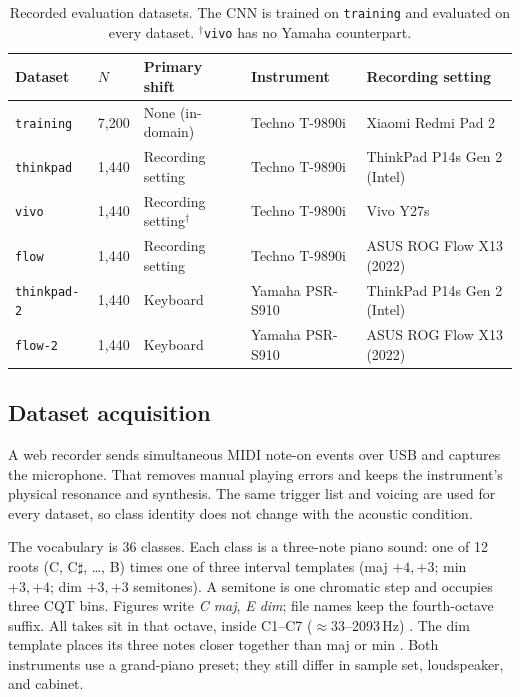 \documentclass[pdflatex,sn-mathphys-num,iicol]{sn-jnl}
\theoremstyle{thmstyleone}
\theoremstyle{thmstyletwo}
\theoremstyle{thmstylethree}
\begin{document}
\begin{table}[t]
\caption{Recorded evaluation datasets. The CNN is trained on \texttt{training} and evaluated on every dataset. $^\dagger$\texttt{vivo} has no Yamaha counterpart.}\label{tab:scenarios}
\begin{tabular*}{\textwidth}{@{\extracolsep{\fill}}lllll@{}}
\toprule
Dataset & $N$ & Primary shift & Instrument & Recording setting \\
\midrule
\texttt{training} & 7{,}200 & None (in-domain) & Techno T-9890i & Xiaomi Redmi Pad 2 \\
\texttt{thinkpad} & 1{,}440 & Recording setting & Techno T-9890i & ThinkPad P14s Gen 2 (Intel) \\
\texttt{vivo} & 1{,}440 & Recording setting$^\dagger$ & Techno T-9890i & Vivo Y27s \\
\texttt{flow} & 1{,}440 & Recording setting & Techno T-9890i & ASUS ROG Flow X13 (2022) \\
\texttt{thinkpad-2} & 1{,}440 & Keyboard & Yamaha PSR-S910 & ThinkPad P14s Gen 2 (Intel) \\
\texttt{flow-2} & 1{,}440 & Keyboard & Yamaha PSR-S910 & ASUS ROG Flow X13 (2022) \\
\bottomrule
\end{tabular*}
\end{table}

\subsection{Dataset acquisition}\label{subsec3_1}

A web recorder sends simultaneous MIDI note-on events over USB and captures the microphone. That removes manual playing errors and keeps the instrument's physical resonance and synthesis. The same trigger list and voicing are used for every dataset, so class identity does not change with the acoustic condition.

The vocabulary is 36 classes. Each class is a three-note piano sound: one of 12 roots (C, C$\sharp$, \ldots, B) times one of three interval templates (maj $+4,+3$; min $+3,+4$; dim $+3,+3$ semitones). A semitone is one chromatic step and occupies three CQT bins. Figures write \emph{C maj}, \emph{E dim}; file names keep the fourth-octave suffix. All takes sit in that octave, inside C1--C7 ($\approx$33--2093\,Hz) \cite{Telila2023}\cite{Harte2010}. The dim template places its three notes closer together than maj or min \cite{Byambatsogt2020}. Both instruments use a grand-piano preset; they still differ in sample set, loudspeaker, and cabinet.
\end{document}
